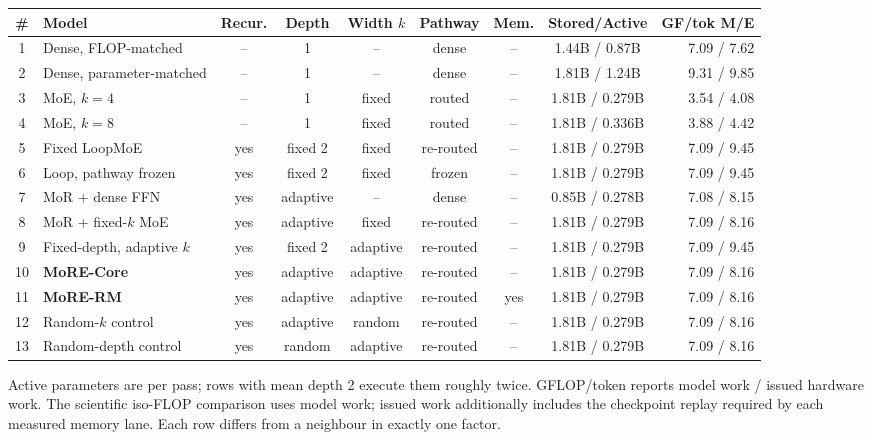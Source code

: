 \documentclass[11pt]{article}
\begin{document}
\begin{center}
\footnotesize
\setlength{\tabcolsep}{3pt}
\begin{tabular}{clccccccr}
\toprule
\# & Model & Recur. & Depth & Width $k$ & Pathway & Mem. & Stored/Active & GF/tok M/E \\
\midrule
1 & Dense, FLOP-matched & -- & 1 & -- & dense & -- & 1.44B / 0.87B & 7.09 / 7.62 \\
2 & Dense, parameter-matched & -- & 1 & -- & dense & -- & 1.81B / 1.24B & 9.31 / 9.85 \\
3 & MoE, $k{=}4$ & -- & 1 & fixed & routed & -- & 1.81B / 0.279B & 3.54 / 4.08 \\
4 & MoE, $k{=}8$ & -- & 1 & fixed & routed & -- & 1.81B / 0.336B & 3.88 / 4.42 \\
5 & Fixed LoopMoE & yes & fixed 2 & fixed & re-routed & -- & 1.81B / 0.279B & 7.09 / 9.45 \\
6 & Loop, pathway frozen & yes & fixed 2 & fixed & frozen & -- & 1.81B / 0.279B & 7.09 / 9.45 \\
7 & MoR + dense FFN & yes & adaptive & -- & dense & -- & 0.85B / 0.278B & 7.08 / 8.15 \\
8 & MoR + fixed-$k$ MoE & yes & adaptive & fixed & re-routed & -- & 1.81B / 0.279B & 7.09 / 8.16 \\
9 & Fixed-depth, adaptive $k$ & yes & fixed 2 & adaptive & re-routed & -- & 1.81B / 0.279B & 7.09 / 9.45 \\
10 & \textbf{MoRE-Core} & yes & adaptive & adaptive & re-routed & -- & 1.81B / 0.279B & 7.09 / 8.16 \\
11 & \textbf{MoRE-RM} & yes & adaptive & adaptive & re-routed & yes & 1.81B / 0.279B & 7.09 / 8.16 \\
\midrule
12 & Random-$k$ control & yes & adaptive & random & re-routed & -- & 1.81B / 0.279B & 7.09 / 8.16 \\
13 & Random-depth control & yes & random & adaptive & re-routed & -- & 1.81B / 0.279B & 7.09 / 8.16 \\
\bottomrule
\end{tabular}
\end{center}

Active parameters are per pass; rows with mean depth 2 execute them roughly
twice. GFLOP/token reports model work / issued hardware work. The scientific
iso-FLOP comparison uses model work; issued work additionally includes the
checkpoint replay required by each measured memory lane. Each row differs from
a neighbour in exactly one factor.
\end{document}
